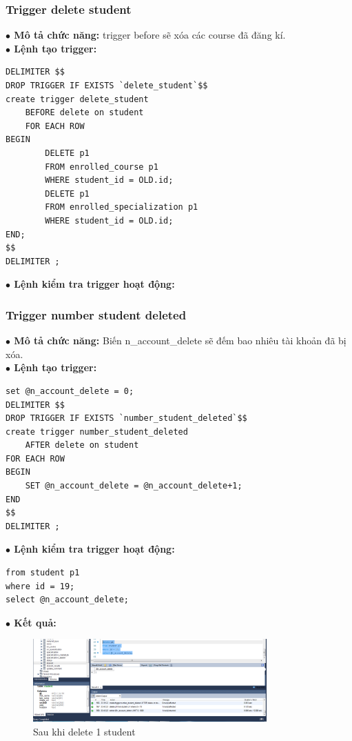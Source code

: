 \documentclass[12pt,a4paper,titlepage]{article}
\begin{document}
\subsubsection{Trigger delete student}
\textbf{$\bullet$ Mô tả chức năng:} trigger before sẽ xóa các course đã đăng kí.\\
\textbf{$\bullet$ Lệnh tạo trigger:}
\begin{lstlisting}
DELIMITER $$
DROP TRIGGER IF EXISTS `delete_student`$$
create trigger delete_student 
	BEFORE delete on student 
    FOR EACH ROW
BEGIN
		DELETE p1 
        FROM enrolled_course p1
        WHERE student_id = OLD.id;
        DELETE p1 
        FROM enrolled_specialization p1
        WHERE student_id = OLD.id;
END;
$$
DELIMITER ;
\end{lstlisting}
\textbf{$\bullet$ Lệnh kiểm tra trigger hoạt động:}
\subsubsection{Trigger number student deleted}
\textbf{$\bullet$ Mô tả chức năng:} Biến n_account_delete sẽ đếm bao nhiêu tài khoản đã bị xóa.\\
\textbf{$\bullet$ Lệnh tạo trigger:}
\begin{lstlisting}
set @n_account_delete = 0;
DELIMITER $$
DROP TRIGGER IF EXISTS `number_student_deleted`$$
create trigger number_student_deleted
	AFTER delete on student
FOR EACH ROW
BEGIN
	SET @n_account_delete = @n_account_delete+1;
END    
$$
DELIMITER ;
\end{lstlisting}
\textbf{$\bullet$ Lệnh kiểm tra trigger hoạt động:}
\begin{lstlisting}
from student p1
where id = 19;
select @n_account_delete;
\end{lstlisting}
\textbf{$\bullet$ Kết quả:}
\begin{figure}[h!]
	\centering
	\caption{Sau khi delete 1 student}
	\includegraphics[width=0.8\textwidth]{images/image6.png}
\end{figure}
\end{document}

